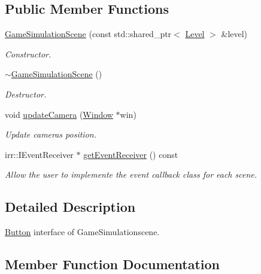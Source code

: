\subsection*{Public Member Functions}
\begin{DoxyCompactItemize}
\item 
\mbox{\label{classGameSimulationScene_a6983b2c511d45278121bcf62151fbb19}} 
\hyperlink{classGameSimulationScene_a6983b2c511d45278121bcf62151fbb19}{Game\+Simulation\+Scene} (const std\+::shared\+\_\+ptr$<$ \hyperlink{classLevel}{Level} $>$ \&level)
\begin{DoxyCompactList}\small\item\em Constructor. \end{DoxyCompactList}\item 
\mbox{\label{classGameSimulationScene_af45f3e7f70376e59a6f320f21ce2897b}} 
\hyperlink{classGameSimulationScene_af45f3e7f70376e59a6f320f21ce2897b}{$\sim$\+Game\+Simulation\+Scene} ()
\begin{DoxyCompactList}\small\item\em Destructor. \end{DoxyCompactList}\item 
void \hyperlink{classGameSimulationScene_a66b107f708b5eed87a3c0a0016541d29}{update\+Camera} (\hyperlink{classWindow}{Window} $\ast$win)
\begin{DoxyCompactList}\small\item\em Update camera\textquotesingle{}s position. \end{DoxyCompactList}\item 
irr\+::\+I\+Event\+Receiver $\ast$ \hyperlink{classGameSimulationScene_a048b2a937caff3af7b4d54f8bd404ec1}{get\+Event\+Receiver} () const
\begin{DoxyCompactList}\small\item\em Allow the user to implemente the event callback class for each scene. \end{DoxyCompactList}\end{DoxyCompactItemize}


\subsection{Detailed Description}
\hyperlink{classButton}{Button} interface of Game\+Simulationscene. 

\subsection{Member Function Documentation}
\mbox{\label{classGameSimulationScene_a048b2a937caff3af7b4d54f8bd404ec1}} 
